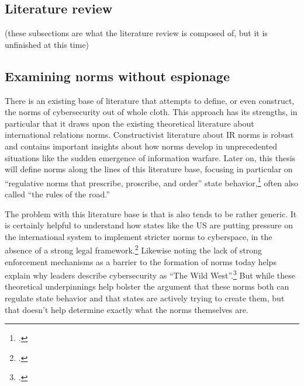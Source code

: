 \documentclass{memoir}
\begin{document}
\begin{refsegment}

\section{Literature review}
(these subsections are what the literature review is composed of, but it is unfinished at this time)

\subsection{Examining norms without espionage}
There is an existing base of literature that attempts to define, or even construct, the norms of cybersecurity out of whole cloth. This approach has its strengths, in particular that it draws upon the existing theoretical literature about international relations norms. Constructivist literature about IR norms is robust and contains important insights about how norms develop in unprecedented situations like the sudden emergence of information warfare. Later on, this thesis will define norms along the lines of this literature base, focusing in particular on ``regulative norms that prescribe, proscribe, and order'' state behavior,\footcite{bjorkdahl_norms_2002} often also called ``the rules of the road.''

The problem with this literature base is that is also tends to be rather generic. It is certainly helpful to understand how states like the US are putting pressure on the international system to implement stricter norms to cyberspace, in the absence of a strong legal framework.\footcite[~p.7]{finnemore_constructing_2016} Likewise noting the lack of strong enforcement mechanisms as a barrier to the formation of norms today helps explain why leaders describe cybersecurity as ``The Wild West''.\footcite{iasiello_what_2016} But while these theoretical underpinnings help bolster the argument that these norms both can regulate state behavior and that states are actively trying to create them, but that doesn't help determine exactly what the norms themselves are.


\end{refsegment}
\end{document}
